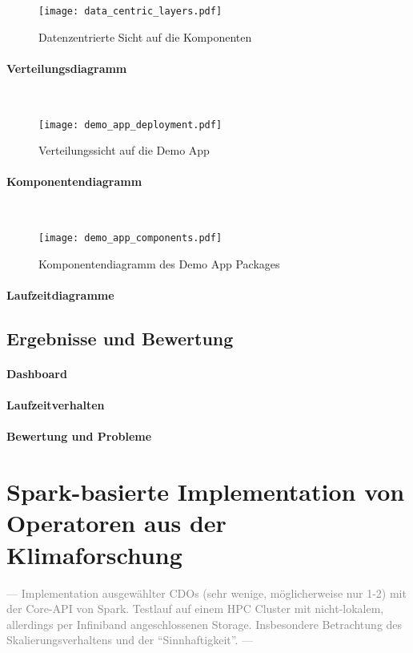 \begin{figure}[ht!]
	\centering
  \texttt{[image: data\_centric\_layers.pdf]}
	\caption{Datenzentrierte Sicht auf die Komponenten}
	\label{figure:data_centrice_layers}
\end{figure}


\paragraph{Verteilungsdiagramm}\\

\begin{figure}[ht!]
	\centering
  \texttt{[image: demo\_app\_deployment.pdf]}
	\caption{Verteilungssicht auf die Demo App}
	\label{figure:demo_app_verteilung}
\end{figure}

\paragraph{Komponentendiagramm}\\

\begin{figure}[ht!]
	\centering
  \texttt{[image: demo\_app\_components.pdf]}
	\caption{Komponentendiagramm des Demo App Packages}
	\label{figure:demo_app_komponenten}
\end{figure}

\paragraph{Laufzeitdiagramme}


\subsection{Ergebnisse und Bewertung}
\paragraph{Dashboard}
\paragraph{Laufzeitverhalten}
\paragraph{Bewertung und Probleme}


\section{Spark-basierte Implementation von Operatoren aus der Klimaforschung}
\textcolor{gray}{--- Implementation ausgewählter CDOs (sehr wenige, möglicherweise nur 1-2) mit der Core-API von Spark. Testlauf auf einem HPC Cluster mit nicht-lokalem, allerdings per Infiniband angeschlossenen Storage.
Insbesondere Betrachtung des Skalierungsverhaltens und der "`Sinnhaftigkeit"'. ---}

